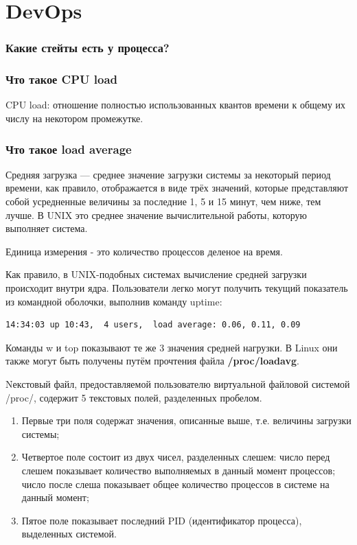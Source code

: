 \part{DevOps}

\section{Какие стейты есть у процесса?}

\section{Что такое CPU load}
CPU load: отношение полностью использованных квантов времени к общему их числу на некотором промежутке.

\section{Что такое load average}
Средняя загрузка — среднее значение загрузки системы за некоторый период времени, как правило, отображается в виде трёх значений, которые представляют собой усредненные величины за последние 1, 5 и 15 минут, чем ниже, тем лучше. В UNIX это среднее значение вычислительной работы, которую выполняет система.

Единица измерения - это количество процессов деленое на время.

Как правило, в UNIX-подобных системах вычисление средней загрузки происходит внутри ядра. Пользователи легко могут получить текущий показатель из командной оболочки, выполнив команду uptime: 

\begin{lstlisting}
14:34:03 up 10:43,  4 users,  load average: 0.06, 0.11, 0.09
\end{lstlisting}

Команды w и top показывают те же 3 значения средней нагрузки. В Linux они также могут быть получены путём прочтения файла \textbf{/proc/loadavg}. 

Nекстовый файл, предоставляемой пользователю виртуальной файловой системой /proc/, содержит 5 текстовых полей, разделенных пробелом. 
\begin{enumerate}
\item Первые три поля содержат значения, описанные выше, т.е. величины загрузки системы;
\item Четвертое поле состоит из двух чисел, разделенных слешем: число перед слешем показывает количество выполняемых в данный момент процессов; число после слеша показывает общее количество процессов в системе на данный момент;
\item Пятое поле показывает последний PID (идентификатор процесса), выделенных системой. 
\end{enumerate}

